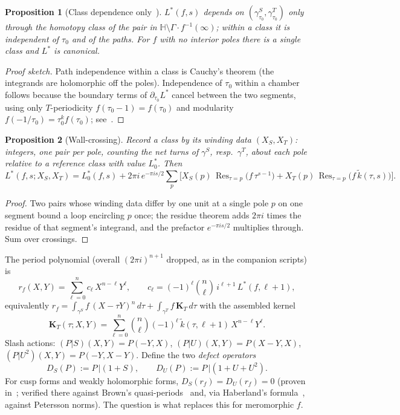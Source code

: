 \documentclass[11pt]{article}
\newtheorem{proposition}{Proposition}
\theoremstyle{definition}
\theoremstyle{remark}
\newcommand{\HH}{\mathbb{H}}
\newcommand{\Res}{\operatorname{Res}}
\newcommand{\tk}{\widetilde{k}}
\newcommand{\KT}{\mathbf{K}_T}
\begin{document}
\begin{proposition}[Class dependence only~{\cite{FCC}}]\label{prop:indep}
$L^*(f,s)$ depends on $(\gamma^S_{\tau_0},\gamma^T_{\tau_0})$ only through the homotopy
class of the pair in $\HH\setminus\Gamma\!\cdot\!f^{-1}(\infty)$; within a class it is
independent of $\tau_0$ and of the paths.  For $f$ with no interior poles there is a
single class and $L^*$ is canonical.
\end{proposition}

\begin{proof}[Proof sketch]
Path independence within a class is Cauchy's theorem (the integrands are holomorphic off
the poles).  Independence of $\tau_0$ within a chamber follows because the boundary terms
of $\partial_{\tau_0}L^*$ cancel between the two segments, using only $T$-periodicity
$f(\tau_0-1)=f(\tau_0)$ and modularity $f(-1/\tau_0)=\tau_0^kf(\tau_0)$; see~\cite{FCC}.
\end{proof}

\begin{proposition}[Wall-crossing]\label{prop:wall}
Record a class by its \emph{winding data} $(X_S,X_T)$: integers, one pair per pole,
counting the net turns of $\gamma^S$, resp.\ $\gamma^T$, about each pole relative to a
reference class with value $L^*_0$.  Then
\begin{equation}\label{eq:wall}
L^*(f,s;X_S,X_T)=L^*_0(f,s)
+2\pi i\,e^{-\pi i s/2}\sum_{p}\Big[X_S(p)\,\Res_{\tau=p}\!\big(f\,\tau^{s-1}\big)
+X_T(p)\,\Res_{\tau=p}\!\big(f\,\tk(\tau,s)\big)\Big].
\end{equation}
\end{proposition}

\begin{proof}
Two pairs whose winding data differ by one unit at a single pole $p$ on one segment bound
a loop encircling $p$ once; the residue theorem adds $2\pi i$ times the residue of that
segment's integrand, and the prefactor $e^{-\pi is/2}$ multiplies through.  Sum over
crossings.
\end{proof}

The period polynomial (overall $(2\pi i)^{n+1}$ dropped, as in the
companion scripts) is
\begin{equation}\label{eq:rf}
r_f(X,Y)=\sum_{\ell=0}^{n}c_\ell\,X^{n-\ell}Y^\ell,
\qquad
c_\ell=(-1)^\ell\binom{n}{\ell}\,i^{\ell+1}\,L^*(f,\ell+1),
\end{equation}
equivalently $r_f=\int_{\gamma^S}f\,(X-\tau Y)^n\,d\tau+\int_{\gamma^T}f\,\KT\,d\tau$ with
the assembled kernel
\begin{equation}\label{eq:KT}
\KT(\tau;X,Y)=\sum_{\ell=0}^{n}\binom{n}{\ell}(-1)^{\ell}\,\tk(\tau,\ell+1)\,X^{n-\ell}Y^{\ell}.
\end{equation}
Slash actions: $(P|S)(X,Y)=P(-Y,X)$, $(P|U)(X,Y)=P(X-Y,X)$, $(P|U^2)(X,Y)=P(-Y,X-Y)$.
Define the two \emph{defect operators}
\[
D_S(P) := P\,|(1+S), \qquad D_U(P) := P\,|(1+U+U^2).
\]
For cusp forms and weakly holomorphic forms, $D_S(r_f)=D_U(r_f)=0$ (proven
in~\cite{FCC}; verified there against Brown's quasi-periods~\cite{Brown2017} and, via
Haberland's formula~\cite{Cohen2013}, against Petersson norms).
The question is what replaces this for meromorphic $f$.
\end{document}
